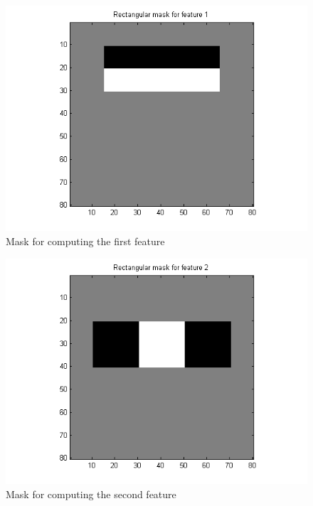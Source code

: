\begin{figure}[h!tb]
	\centering
		\includegraphics[width=\textwidth]{./img/ex1/mask1.png}
	\caption{Mask for computing the first feature}
	\label{fig:mask1}
\end{figure}

\begin{figure}[h!tb]
	\centering
		\includegraphics[width=\textwidth]{./img/ex1/mask2.png}
	\caption{Mask for computing the second feature}
	\label{fig:mask2}
\end{figure}


